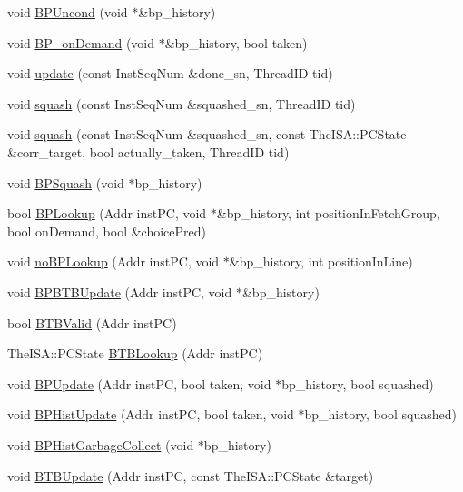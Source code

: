 \begin{DoxyCompactItemize}
\item 
void \hyperlink{classBPredUnit_a24bfe00e5e8c2a318930a6474ed60173}{BPUncond} (void $\ast$\&bp\_\-history)
\item 
void \hyperlink{classBPredUnit_a282f0c689c4cedfb52221c1ce96b4084}{BP\_\-onDemand} (void $\ast$\&bp\_\-history, bool taken)
\item 
void \hyperlink{classBPredUnit_aa154b29fbf52ad49d89a046e94b53ac9}{update} (const InstSeqNum \&done\_\-sn, ThreadID tid)
\item 
void \hyperlink{classBPredUnit_a94a04b4bdf8f6b9b3cf33882bc16067b}{squash} (const InstSeqNum \&squashed\_\-sn, ThreadID tid)
\item 
void \hyperlink{classBPredUnit_a78e6f48f8a11db90daab850527d48aa7}{squash} (const InstSeqNum \&squashed\_\-sn, const TheISA::PCState \&corr\_\-target, bool actually\_\-taken, ThreadID tid)
\item 
void \hyperlink{classBPredUnit_a14a43c5f5bc8c64c07a075ce1608f9c3}{BPSquash} (void $\ast$bp\_\-history)
\item 
bool \hyperlink{classBPredUnit_aafefe8c8d85f49d118e825fa0c1c0176}{BPLookup} (Addr instPC, void $\ast$\&bp\_\-history, int positionInFetchGroup, bool onDemand, bool \&choicePred)
\item 
void \hyperlink{classBPredUnit_af5b3e6db0cf1f00dee290e16765f28f8}{noBPLookup} (Addr instPC, void $\ast$\&bp\_\-history, int positionInLine)
\item 
void \hyperlink{classBPredUnit_a55a6608f958c4e70360c34bd48c57032}{BPBTBUpdate} (Addr instPC, void $\ast$\&bp\_\-history)
\item 
bool \hyperlink{classBPredUnit_a66a1f6f9cdd28b38b005a666a9976ed7}{BTBValid} (Addr instPC)
\item 
TheISA::PCState \hyperlink{classBPredUnit_a31024f2d92bfd7e778a790f4c6f61498}{BTBLookup} (Addr instPC)
\item 
void \hyperlink{classBPredUnit_a35c57ae0661f1d5dd2169e919741d47b}{BPUpdate} (Addr instPC, bool taken, void $\ast$bp\_\-history, bool squashed)
\item 
void \hyperlink{classBPredUnit_a16de9793a28ee07dcf26d89c03328555}{BPHistUpdate} (Addr instPC, bool taken, void $\ast$bp\_\-history, bool squashed)
\item 
void \hyperlink{classBPredUnit_a9268abcbddfdfd6e6a076ecd343a3de5}{BPHistGarbageCollect} (void $\ast$bp\_\-history)
\item 
void \hyperlink{classBPredUnit_a5afe025cde23c608d745e8daca63e8a6}{BTBUpdate} (Addr instPC, const TheISA::PCState \&target)
\end{DoxyCompactItemize}



